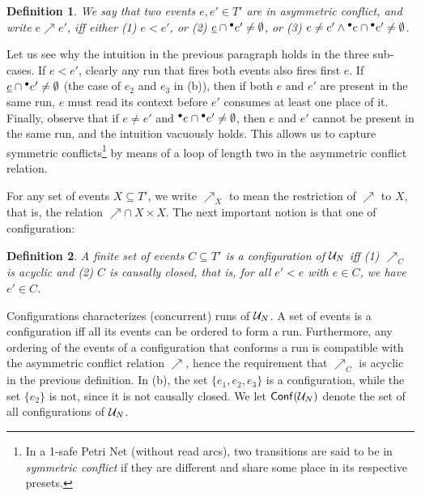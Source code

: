 \documentclass[11pt,a4paper]{article}
\newtheorem{definition}{Definition}
\newcommand{\conf}[1]{\ensuremath{\mathsf{Conf}(#1)}}
\newcommand{\confl}{\ensuremath{\mathord{\#}}}
\newcommand{\evolves}{{\ensuremath{\ \sqsubseteq \ }}}
\begin{document}
\begin{definition}
\label{def:asymmetric.conflict}
We say that two events $e, e' \in T'$ are in \emph{asymmetric conflict}, and
write $e \nearrow e'$, iff either (1) $e < e'$, or (2) $\underline{e} \cap {}^\bullet e'
\not= \emptyset$, or (3) $e \not= e' \land {}^\bullet e \cap {}^\bullet e' \not=
\emptyset$.
\end{definition}

Let us see why the intuition in the previous paragraph holds in the three
sub-cases.  If $e < e'$, clearly any run that fires both events also fires
first $e$.  If $\underline{e} \cap {}^\bullet e' \not = \emptyset$ (the case of $e_2$ and
$e_3$ in  (b)), then if both $e$ and $e'$ are present in the same
run, $e$ must read its context before $e'$ consumes at least one place of it.
Finally, observe that if $e \not = e'$ and ${}^\bullet e \cap {}^\bullet e' \not =
\emptyset$, then $e$ and $e'$ cannot be present in the same run, and the
intuition vacuously holds.  This allows us to capture symmetric
conflicts\footnote{In a 1-safe Petri Net (without read arcs), two transitions
are said to be in \emph{symmetric conflict} if they are different and share
some place in its respective presets.} by means of a loop of length two in the
asymmetric conflict relation.

For any set of events $X \subseteq T'$, we write $\nearrow_X$ to mean the
restriction of $\nearrow$ to $X$, that is, the relation $\nearrow \cap \ X
\times X$.  The next important notion is that one of configuration:

\begin{definition}
A finite set of events $C \subseteq T'$ is a \emph{configuration} of $\mathcal{U}_{N}$
iff (1) $\nearrow_C$ is acyclic and (2) $C$ is causally closed, that is, for
all $e' < e$ with $e \in C$, we have $e' \in C$.
\end{definition}

Configurations characterizes (concurrent) runs of $\mathcal{U}_{N}$.  A set of events is
a configuration iff all its events can be ordered to form a run.  Furthermore,
any ordering of the events of a configuration that conforms a run is compatible
with the asymmetric conflict relation $\nearrow$, hence the requirement that
$\nearrow_C$ is acyclic in the previous definition.  In  (b), the
set $\{e_1, e_2, e_3\}$ is a configuration, while the set $\{e_2\}$ is not,
since it is not causally closed.  We let $\conf{\unf N}$ denote the set of all
configurations of $\mathcal{U}_{N}$.

\FIXME{Present here $\evolves$ and $\confl$}
\end{document}
